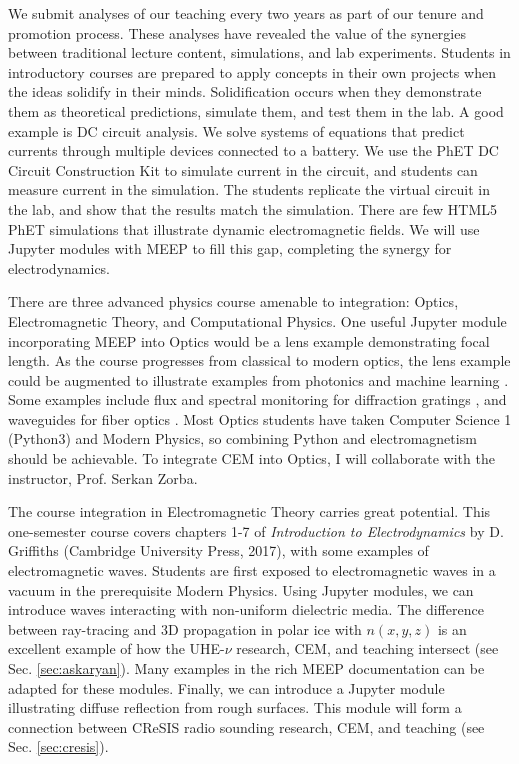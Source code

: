 \documentclass[11pt]{amsart}
\begin{document}
We submit analyses of our teaching every two years as part of our tenure and promotion process.  These analyses have revealed the value of the synergies between traditional lecture content, simulations, and lab experiments.  Students in introductory courses are prepared to apply concepts in their own projects when the ideas solidify in their minds.  Solidification occurs when they demonstrate them as theoretical predictions, simulate them, and test them in the lab.  A good example is DC circuit analysis.  We solve systems of equations that predict currents through multiple devices connected to a battery.  We use the PhET DC Circuit Construction Kit to simulate current in the circuit, and students can measure current in the simulation.  The students replicate the virtual circuit in the lab, and show that the results match the simulation.  There are few HTML5 PhET simulations that illustrate dynamic electromagnetic fields.  We will use Jupyter modules with MEEP to fill this gap, completing the synergy for electrodynamics. 

There are three advanced physics course amenable to integration: Optics, Electromagnetic Theory, and Computational Physics.  One useful Jupyter module incorporating MEEP into Optics would be a lens example demonstrating focal length.  As the course progresses from classical to modern optics, the lens example could be augmented to illustrate examples from photonics and machine learning \cite{meepcon2022_3}.  Some examples include flux and spectral monitoring for diffraction gratings \cite{meepcon2022_4}, and waveguides for fiber optics \cite{meepcon2022_5}.  Most Optics students have taken Computer Science 1 (Python3) and Modern Physics, so combining Python and electromagnetism should be achievable.  To integrate CEM into Optics, I will collaborate with the instructor, Prof. Serkan Zorba.  

The course integration in Electromagnetic Theory carries great potential.  This one-semester course covers chapters 1-7 of \textit{Introduction to Electrodynamics} by D. Griffiths (Cambridge University Press, 2017), with some examples of electromagnetic waves.  Students are first exposed to electromagnetic waves in a vacuum in the prerequisite Modern Physics.  Using Jupyter modules, we can introduce waves interacting with non-uniform dielectric media.  The difference between ray-tracing and 3D propagation in polar ice with $n(x,y,z)$ is an excellent example of how the UHE-$\nu$ research, CEM, and teaching intersect (see Sec. \ref{sec:askaryan}).  Many examples in the rich MEEP documentation can be adapted for these modules.  Finally, we can introduce a Jupyter module illustrating diffuse reflection from rough surfaces.  This module will form a connection between CReSIS radio sounding research, CEM, and teaching (see Sec. \ref{sec:cresis}).  
\end{document}

